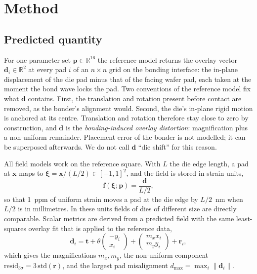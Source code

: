 \documentclass[11pt]{article}
\begin{document}
\begin{table}[t]\centering\small
\caption{Swept parameters of the reference model. Log-scaled parameters are sampled uniformly in $\log$.}\label{tab:params}

\end{table}

\section{Method}\label{sec:method}

\subsection{Predicted quantity}\label{sec:quantity}
For one parameter set $\mathbf{p}\in\mathbb{R}^{16}$ the reference model returns the overlay vector
$\mathbf{d}_i\in\mathbb{R}^2$ at every pad $i$ of an $n\times n$ grid on the bonding interface: the in-plane
displacement of the die pad minus that of the facing wafer pad, each taken at the moment the bond wave locks the
pad. Two conventions of the reference model fix what $\mathbf{d}$ contains. First, the translation and rotation present
before contact are removed, as the bonder's alignment would. Second, the die's in-plane rigid motion is anchored at
its centre. Translation and rotation therefore stay close to zero by construction, and $\mathbf{d}$ is the
\emph{bonding-induced overlay distortion}: magnification plus a non-uniform remainder. Placement error of the bonder
is not modelled; it can be superposed afterwards. We do not call $\mathbf{d}$ ``die shift'' for this reason.

All field models work on the reference square. With $L$ the die edge length, a pad at $\mathbf{x}$ maps to
$\boldsymbol\xi=\mathbf{x}/(L/2)\in[-1,1]^2$, and the field is stored in strain units,
\begin{equation}
  \mathbf{f}(\boldsymbol\xi;\mathbf{p}) = \frac{\mathbf{d}}{L/2},
\end{equation}
so that \SI{1}{ppm} of uniform strain moves a pad at the die edge by $L/2$~nm when $L/2$ is in millimetres. In these
units fields of dies of different size are directly comparable. Scalar metrics are derived from a predicted field with
the same least-squares overlay fit that is applied to the reference data,
\begin{equation}\label{eq:overlayfit}
  \mathbf{d}_i = \mathbf{t} + \theta\begin{pmatrix}-y_i\\ x_i\end{pmatrix}
               + \begin{pmatrix}m_x x_i\\ m_y y_i\end{pmatrix} + \mathbf{r}_i ,
\end{equation}
which gives the magnifications $m_x, m_y$, the non-uniform component $\mathrm{resid}_{3\sigma}=3\,\mathrm{std}(\mathbf{r})$,
and the largest pad misalignment $d_{\max}=\max_i\lVert\mathbf{d}_i\rVert$.
\end{document}
